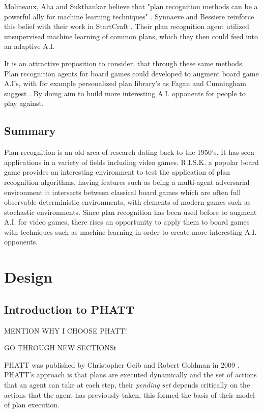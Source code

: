 \documentclass[parskip]{cs4rep}
\begin{document}
Molineaux, Aha and Sukthankar believe that "plan recognition methods can be a powerful ally for machine learning techniques" \cite{Molineaux09g.:beating}. Synnaeve and Bessiere reinforce this belief with their work in StartCraft \cite{conf/aiide/SynnaeveB11}. Their plan recognition agent utilized unsupervised machine learning of common plans, which they then could feed into an adaptive A.I. 

 It is an attractive proposition to consider, that through these same methods. Plan recognition agents for board games could developed to augment board game A.I's, with for example personalized plan library's as Fagan and Cunningham suggest \cite{Fagan03case-basedplan}. By doing aim to build more interesting A.I. opponents for people to play against.

\section{Summary}

Plan recognition is an old area of research dating back to the 1950's. It has seen applications in a variety of fields including video games. R.I.S.K. a popular board game provides an interesting environment to test the application of plan recognition algorithms, having features such as being a multi-agent adversarial environment it intersects between classical board games which are often full observable deterministic environments, with elements of modern games such as stochastic environments. Since plan recognition has been used before to augment A.I. for video games, there rises an opportunity to apply them to board games with techniques such as machine learning in-order to create more interesting A.I. opponents.

\chapter{Design}

\section{Introduction to PHATT}

MENTION WHY I CHOOSE PHATT!

GO THROUGH NEW SECTIONSt

PHATT was published by Christopher Geib and Robert Goldman in 2009 \cite{Geib:2009:PPR:1550966.1551246}. PHATT's approach is that plans are executed dynamically and the set of actions that an agent can take at each step, their \textit{pending set} depends critically on the actions that the agent has previously taken, this formed the basis of their model of plan execution.
\end{document}
